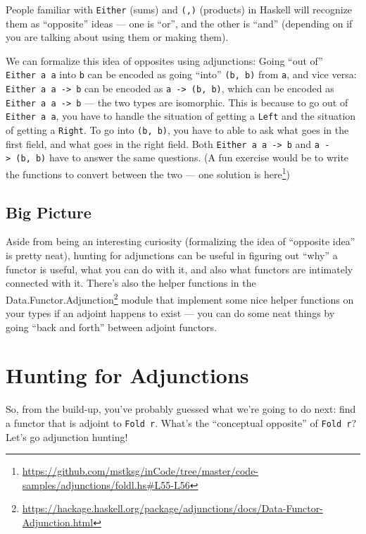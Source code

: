 \documentclass[]{article}
\renewcommand{\href}[2]{#2\footnote{\url{#1}}}
\begin{document}
People familiar with \texttt{Either} (sums) and \texttt{(,)} (products) in
Haskell will recognize them as ``opposite'' ideas --- one is ``or'', and the
other is ``and'' (depending on if you are talking about using them or making
them).

We can formalize this idea of opposites using adjunctions: Going ``out of''
\texttt{Either\ a\ a} into \texttt{b} can be encoded as going ``into''
\texttt{(b,\ b)} from \texttt{a}, and vice versa:
\texttt{Either\ a\ a\ -\textgreater{}\ b} can be encoded as
\texttt{a\ -\textgreater{}\ (b,\ b)}, which can be encoded as
\texttt{Either\ a\ a\ -\textgreater{}\ b} --- the two types are isomorphic. This
is because to go out of \texttt{Either\ a\ a}, you have to handle the situation
of getting a \texttt{Left} and the situation of getting a \texttt{Right}. To go
into \texttt{(b,\ b)}, you have to able to ask what goes in the first field, and
what goes in the right field. Both \texttt{Either\ a\ a\ -\textgreater{}\ b} and
\texttt{a\ -\textgreater{}\ (b,\ b)} have to answer the same questions. (A fun
exercise would be to write the functions to convert between the two ---
\href{https://github.com/mstksg/inCode/tree/master/code-samples/adjunctions/foldl.hs\#L55-L56}{one
solution is here})

\subsection{Big Picture}\label{big-picture}

Aside from being an interesting curiosity (formalizing the idea of ``opposite
idea'' is pretty neat), hunting for adjunctions can be useful in figuring out
``why'' a functor is useful, what you can do with it, and also what functors are
intimately connected with it. There's also the helper functions in the
\href{https://hackage.haskell.org/package/adjunctions/docs/Data-Functor-Adjunction.html}{Data.Functor.Adjunction}
module that implement some nice helper functions on your types if an adjoint
happens to exist --- you can do some neat things by going ``back and forth''
between adjoint functors.

\section{Hunting for Adjunctions}\label{hunting-for-adjunctions}

So, from the build-up, you've probably guessed what we're going to do next: find
a functor that is adjoint to \texttt{Fold\ r}. What's the ``conceptual
opposite'' of \texttt{Fold\ r}? Let's go adjunction hunting!
\end{document}
